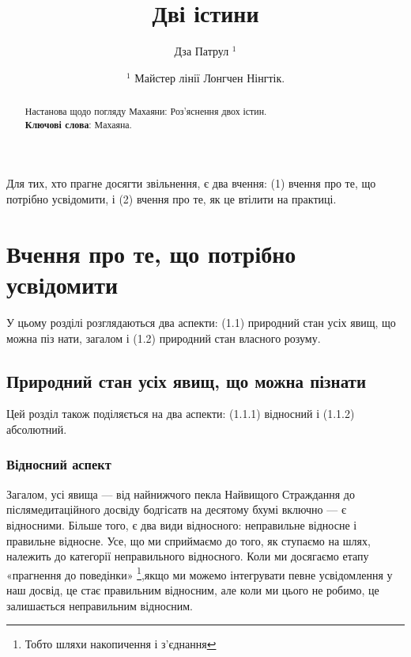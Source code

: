 \documentclass{article}
\begin{document}
\title{Дві істини}
\author{Дза Патрул $^1$}
\date{ $^1$ Майстер лінії Лонгчен Нінгтік. }

\maketitle

\begin{abstract}Настанова щодо погляду Махаяни: Роз’яснення двох істин. \\
\textbf{Ключові слова}: Махаяна.
\end{abstract}

\tableofcontents

\vspace{1cm}

Для тих, хто прагне досягти звільнення, є два вчення: (1) вчення про те, що потрібно усвідомити, і (2) вчення про те, як це втілити на практиці.

\section{Вчення про те, що потрібно усвідомити}

У цьому розділі розглядаються два аспекти: (1.1) природний стан усіх явищ, що можна піз нати, загалом і (1.2) природний стан власного розуму.

\subsection{Природний стан усіх явищ, що можна пізнати}

Цей розділ також поділяється на два аспекти: (1.1.1) відносний і (1.1.2) абсолютний.

\subsubsection{Відносний аспект}
Загалом, усі явища — від найнижчого пекла Найвищого Страждання до післямедитаційного досвіду
бодгісатв на десятому бхумі включно — є відносними. Більше того, є два види відносного:
неправильне відносне і правильне відносне. Усе, що ми сприймаємо до того, як ступаємо на шлях,
належить до категорії неправильного відносного. Коли ми досягаємо етапу «прагнення до поведінки»
\footnote{Тобто шляхи накопичення і з'єднання},якщо ми можемо інтегрувати певне усвідомлення у
наш досвід, це стає правильним відносним, але коли ми цього не робимо, це залишається неправильним відносним.
\end{document}
